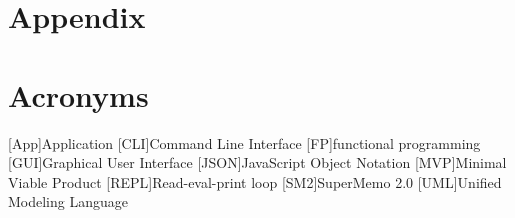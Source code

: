 \chapter{Appendix}

\chapter*{Acronyms}

\begin{acronym}

    [App]{Application}
    [CLI]{Command Line Interface}
    [FP]{functional programming}
    [GUI]{Graphical User Interface}
    [JSON]{JavaScript Object Notation}
    [MVP]{Minimal Viable Product}
    [REPL]{Read-eval-print loop}
    [SM2]{SuperMemo 2.0}
    [UML]{Unified Modeling Language}

\end{acronym}

\listoffigures{}
\lstlistoflistings{}
\listoftables{}
